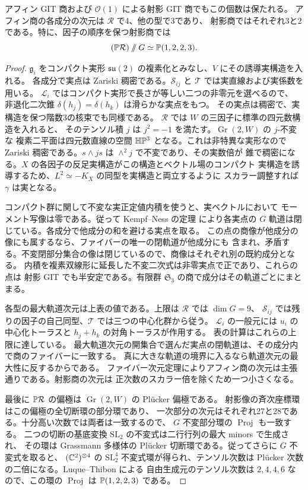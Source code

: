 \begin{proposition}\label{cube:prop:git}
アフィン GIT 商および $\mathcal O(1)$ による射影 GIT 商でもこの個数は保たれる。
アフィン商の各成分の次元は $\mathcal R$ で4、他の型で3であり、
射影商ではそれぞれ3と2である。特に、因子の順序を保つ射影商では
\[
 (\mathbb P\mathcal R)\mathbin{/\mkern-6mu/}G\simeq\mathbb P(1,2,2,3).
\]
\end{proposition}
\begin{proof}
$\mathfrak g_i$ をコンパクト実形 $\mathfrak{su}(2)$ の複素化とみなし、$V$ にその誘導実構造を入れる。
各成分で実点は Zariski 稠密である。$\mathcal S_{ij}$ と $\mathcal T$ では実直線および実係数を用いる。
$\mathcal L_i$ ではコンパクト実形で長さが等しい二つの非零元を選べるので、
非退化二次錐 $\delta(h_j)=\delta(h_k)$ は滑らかな実点をもつ。
その実点は稠密で、実構造を保つ階数3の核束でも同様である。
$\mathcal R$ では $W$ の三因子に標準の四元数構造を入れると、
そのテンソル積 $j$ は $j^2=-1$ を満たす。$\operatorname{Gr}(2,W)$ の $j$-不変な
複素二平面は四元数直線の空間 $\mathbb H\mathbb P^3$ となる。これは非特異な実形なので
Zariski 稠密である。$s\wedge js$ は $\wedge^2j$ で不変であり、その実数倍が
錐で稠密になる。$X$ の各因子の反足実構造がこの構造とベクトル場のコンパクト
実構造を誘導するため、$L^2\simeq -K_X$ の同型を実構造と両立するように
スカラー調整すれば $\gamma$ は実となる。

コンパクト群に関して不変な実正定値内積を使うと、実ベクトルにおいて
モーメント写像は零である。従って Kempf--Ness の定理 \cite{cube-KN} により各実点の
$G$ 軌道は閉じている。各成分で他成分の和を避ける実点を取る。
この点の商像が他成分の像にも属するなら、ファイバーの唯一の閉軌道が他成分にも
含まれ、矛盾する。不変閉部分集合の像は閉じているので、商像はそれぞれ別の既約成分となる。
内積を複素双線形に延長した不変二次式は非零実点で正であり、これらの点は
射影 GIT でも半安定である。有限群 $\mathfrak S_3$ の商で成分はその軌道ごとにまとまる。

各型の最大軌道次元は上表の値である。上限は $\mathcal R$ では $\dim G=9$、
$\mathcal S_{ij}$ では残りの因子の自己同型、$\mathcal T$ では三つの中心化群から従う。
$\mathcal L_i$ の一般元には $u_i$ の中心化トーラスと $h_j+h_k$ の対角トーラスが作用する。
表の計算はこれらの上限に達している。
最大軌道次元の開集合で選んだ実点の閉軌道は、その成分内で商のファイバーに一致する。
真に大きな軌道の境界に入るなら軌道次元の最大性に反するからである。
ファイバー次元定理によりアフィン商の次元は主張通りである。射影商の次元は
正次数のスカラー倍を除くため一つ小さくなる。

最後に $\mathbb P\mathcal R$ の偏極は $\operatorname{Gr}(2,W)$ の Plücker 偏極である。
射影像の斉次座標環はこの偏極の全切断環の部分環であり、
一次部分の次元はそれぞれ27と28である。十分高い次数では両者は一致するので、
$G$ 不変部分環の $\operatorname{Proj}$ も一致する。
二つの切断の基底変換 $\mathrm{SL}_2$ の不変式は二行行列の最大 minors で生成され、
その環は Grassmann 多様体の Plücker 切断環である。従ってさらに $G$ 不変式を取ると、
$(\mathbb C^2)^{\otimes4}$ の $\mathrm{SL}_2^4$ 不変式環が得られ、テンソル次数は
Plücker 次数の二倍になる。Luque--Thibon \cite[\S\S II--III]{cube-LT} による
自由生成元のテンソル次数は $2,4,4,6$ なので、この環の $\operatorname{Proj}$ は
$\mathbb P(1,2,2,3)$ である。
\end{proof}

